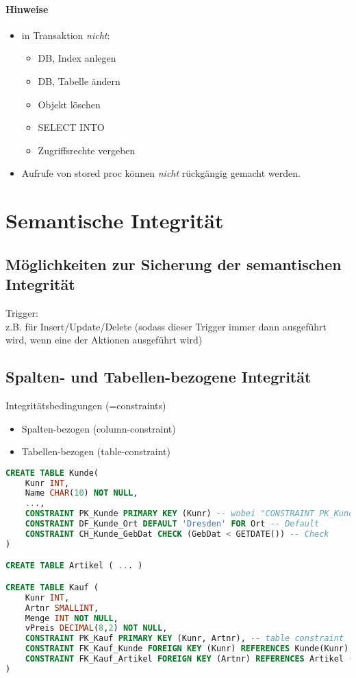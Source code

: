 \paragraph{Hinweise}
\begin{itemize}
\item in Transaktion \emph{nicht}:
\begin{itemize}
\item DB, Index anlegen
\item DB, Tabelle ändern
\item Objekt löschen
\item SELECT INTO
\item Zugriffsrechte vergeben
\end{itemize}
\item Aufrufe von stored proc können \emph{nicht} rückgängig gemacht werden.
\end{itemize}

\section{Semantische Integrität}
\subsection{Möglichkeiten zur Sicherung der semantischen Integrität}
Trigger:\\
z.B. für Insert/Update/Delete (sodass dieser Trigger immer dann ausgeführt wird, wenn eine der Aktionen ausgeführt wird)
\subsection{Spalten- und Tabellen-bezogene Integrität}

Integritätsbedingungen (=constraints)
\begin{itemize}
\item Spalten-bezogen (column-constraint)
\item Tabellen-bezogen (table-constraint)
\end{itemize}
\begin{lstlisting}[language=SQL]
CREATE TABLE Kunde(
	Kunr INT,
	Name CHAR(10) NOT NULL,
	...,
	CONSTRAINT PK_Kunde PRIMARY KEY (Kunr) -- wobei "CONSTRAINT PK_Kunde" optional ist
	CONSTRAINT DF_Kunde_Ort DEFAULT 'Dresden' FOR Ort -- Default
	CONSTRAINT CH_Kunde_GebDat CHECK (GebDat < GETDATE()) -- Check
)

CREATE TABLE Artikel ( ... )

CREATE TABLE Kauf (
	Kunr INT,
	Artnr SMALLINT,
	Menge INT NOT NULL,
	vPreis DECIMAL(8,2) NOT NULL,
	CONSTRAINT PK_Kauf PRIMARY KEY (Kunr, Artnr), -- table constraint
	CONSTRAINT FK_Kauf_Kunde FOREIGN KEY (Kunr) REFERENCES Kunde(Kunr),
	CONSTRAINT FK_Kauf_Artikel FOREIGN KEY (Artnr) REFERENCES Artikel (Artnr)
)
\end{lstlisting}

